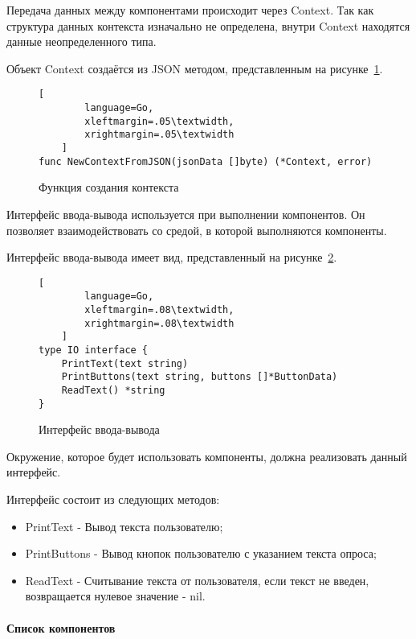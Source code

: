 Передача данных между компонентами происходит через Context. Так
как структура данных контекста изначально не определена, внутри Context
находятся данные неопределенного типа.

Объект Context создаётся из JSON методом, представленным на рисунке~\ref{f:new-context}.

\begin{figure}[ht]
	\centering
	\vspace{\toppaddingoffigure}
	\begin{lstlisting}[
        language=Go,
        xleftmargin=.05\textwidth,
        xrightmargin=.05\textwidth
    ]
func NewContextFromJSON(jsonData []byte) (*Context, error) 
    \end{lstlisting}
	\caption{Функция создания контекста}
	\label{f:new-context}
\end{figure}

Интерфейс ввода-вывода используется при выполнении компонентов.
Он позволяет взаимодействовать со средой, в которой выполняются
компоненты.

Интерфейс ввода-вывода имеет вид, представленный на рисунке~\ref{f:io-interface}.


\begin{figure}[ht]
	\centering
	\vspace{\toppaddingoffigure}
	\begin{lstlisting}[
        language=Go,
        xleftmargin=.08\textwidth,
        xrightmargin=.08\textwidth
    ]
type IO interface {
	PrintText(text string)
	PrintButtons(text string, buttons []*ButtonData)
	ReadText() *string
}
    \end{lstlisting}
	\caption{Интерфейс ввода-вывода}
	\label{f:io-interface}
\end{figure}

Окружение, которое будет использовать компоненты, должна
реализовать данный интерфейс.

Интерфейс состоит из следующих методов:
\begin{itemize}
	\item PrintText - Вывод текста пользователю;
	\item PrintButtons - Вывод кнопок пользователю с указанием текста
	      опроса;
	\item ReadText - Считывание текста от пользователя, если текст не
	      введен, возвращается нулевое значение - nil.
\end{itemize}


\paragraph{Список компонентов}

